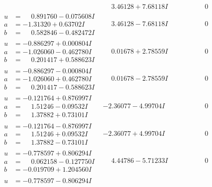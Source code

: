 \documentclass[1p]{elsarticle_modified}
\theoremstyle{definition}
\begin{document}
$$\begin{array}{c|c|c}
 & \phantom{-}3.46128 + 7.68118 I & \phantom{-0.000000 } 0 \\ \hline\begin{aligned}
u &= \phantom{-}0.891760 - 0.075608 I \\
a &= -1.31320 + 0.63702 I \\
b &= \phantom{-}0.582846 - 0.482472 I\end{aligned}
 & \phantom{-}3.46128 - 7.68118 I & \phantom{-0.000000 } 0 \\ \hline\begin{aligned}
u &= -0.886297 + 0.000804 I \\
a &= -1.026060 - 0.462780 I \\
b &= \phantom{-}0.201417 + 0.588623 I\end{aligned}
 & \phantom{-}0.01678 + 2.78559 I & \phantom{-0.000000 } 0 \\ \hline\begin{aligned}
u &= -0.886297 - 0.000804 I \\
a &= -1.026060 + 0.462780 I \\
b &= \phantom{-}0.201417 - 0.588623 I\end{aligned}
 & \phantom{-}0.01678 - 2.78559 I & \phantom{-0.000000 } 0 \\ \hline\begin{aligned}
u &= -0.121764 + 0.876997 I \\
a &= \phantom{-}1.51246 - 0.09532 I \\
b &= \phantom{-}1.37882 + 0.73101 I\end{aligned}
 & -2.36077 - 4.99704 I & \phantom{-0.000000 } 0 \\ \hline\begin{aligned}
u &= -0.121764 - 0.876997 I \\
a &= \phantom{-}1.51246 + 0.09532 I \\
b &= \phantom{-}1.37882 - 0.73101 I\end{aligned}
 & -2.36077 + 4.99704 I & \phantom{-0.000000 } 0 \\ \hline\begin{aligned}
u &= -0.778597 + 0.806294 I \\
a &= \phantom{-}0.062158 - 0.127750 I \\
b &= -0.019709 + 1.204560 I\end{aligned}
 & \phantom{-}4.44786 - 5.71233 I & \phantom{-0.000000 } 0 \\ \hline\begin{aligned}
u &= -0.778597 - 0.806294 I \\

\end{aligned}
\end{array}$$
\end{document}
